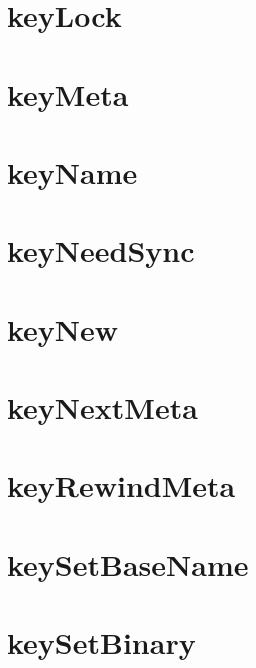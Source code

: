 \let\mypdfximage\pdfximage\def\pdfximage{\immediate\mypdfximage}\documentclass[twoside]{book}
\newcommand{\+}{\discretionary{\mbox{\scriptsize$\hookleftarrow$}}{}{}}
\begin{document}
\chapter{key\+Lock}
\label{doc_api_review_core_keyLock_md}

\chapter{key\+Meta}
\label{doc_api_review_core_keyMeta_md}

\chapter{key\+Name}
\label{doc_api_review_core_keyName_md}

\chapter{key\+Need\+Sync}
\label{doc_api_review_core_keyNeedSync_md}

\chapter{key\+New}
\label{doc_api_review_core_keyNew_md}

\chapter{key\+Next\+Meta}
\label{doc_api_review_core_keyNextMeta_md}

\chapter{key\+Rewind\+Meta}
\label{doc_api_review_core_keyRewindMeta_md}

\chapter{key\+Set\+Base\+Name}
\label{doc_api_review_core_keySetBaseName_md}

\chapter{key\+Set\+Binary}
\label{doc_api_review_core_keySetBinary_md}

\end{document}
